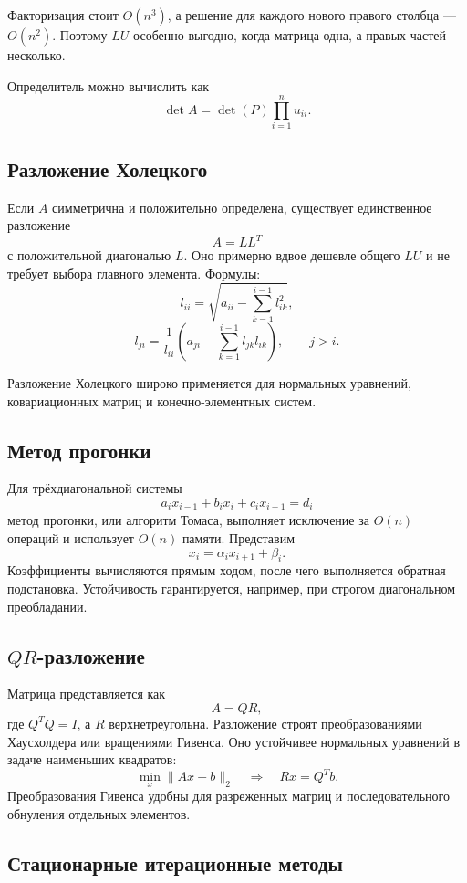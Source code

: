 Факторизация стоит $O(n^3)$, а решение для каждого нового правого столбца ---
$O(n^2)$. Поэтому $LU$ особенно выгодно, когда матрица одна, а правых частей
несколько.

Определитель можно вычислить как
\[
    \det A=\det(P)\prod_{i=1}^{n}u_{ii}.
\]

\subsection{Разложение Холецкого}

Если $A$ симметрична и положительно определена, существует единственное
разложение
\[
    A=LL^{T}
\]
с положительной диагональю $L$. Оно примерно вдвое дешевле общего $LU$ и не
требует выбора главного элемента. Формулы:
\[
 l_{ii}=\sqrt{a_{ii}-\sum_{k=1}^{i-1}l_{ik}^2},
\]
\[
 l_{ji}=\frac{1}{l_{ii}}
 \left(a_{ji}-\sum_{k=1}^{i-1}l_{jk}l_{ik}\right),
 \qquad j>i.
\]

Разложение Холецкого широко применяется для нормальных уравнений, ковариационных
матриц и конечно-элементных систем.

\subsection{Метод прогонки}

Для трёхдиагональной системы
\[
 a_i x_{i-1}+b_i x_i+c_i x_{i+1}=d_i
\]
метод прогонки, или алгоритм Томаса, выполняет исключение за $O(n)$ операций и
использует $O(n)$ памяти. Представим
\[
    x_i=\alpha_i x_{i+1}+\beta_i.
\]
Коэффициенты вычисляются прямым ходом, после чего выполняется обратная
подстановка. Устойчивость гарантируется, например, при строгом диагональном
преобладании.

\subsection[QR-разложение]{$QR$-разложение}

Матрица представляется как
\[
    A=QR,
\]
где $Q^TQ=I$, а $R$ верхнетреугольна. Разложение строят преобразованиями
Хаусхолдера или вращениями Гивенса. Оно устойчивее нормальных уравнений в задаче
наименьших квадратов:
\[
    \min_x\|Ax-b\|_2
    \quad\Longrightarrow\quad
    Rx=Q^Tb.
\]
Преобразования Гивенса удобны для разреженных матриц и последовательного
обнуления отдельных элементов.

\subsection{Стационарные итерационные методы}

